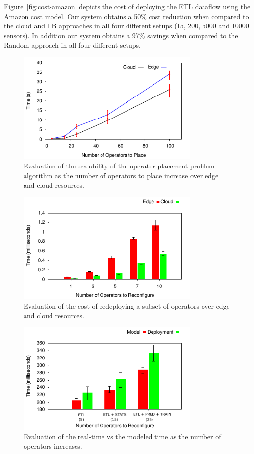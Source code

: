
Figure~\ref{fig:cost-amazon} depicts the cost of deploying the ETL dataflow using the Amazon cost model. Our system obtains a 50\% cost reduction when compared to the cloud and LB approaches in all four different setups (15, 200, 5000 and 10000 sensors). In addition our system obtains a 97\% savings when compared to the Random approach in all four different setups.


\begin{figure}[h]
  \centering
  \includegraphics[width=0.8\textwidth]{Results/Scale.pdf}
  \caption{Evaluation of the scalability of the operator placement problem algorithm as the number of operators to place increase over edge and cloud resources.}
\end{figure}

\begin{figure}[h]
  \centering
  \includegraphics[width=0.8\textwidth]{Results/Redeploy.pdf}
  \caption{Evaluation of the cost of redeploying a subset of operators over edge and cloud resources.}
\end{figure}

\begin{figure}[h]
  \centering
  \includegraphics[width=0.8\textwidth]{Results/Time.pdf}
  \caption{Evaluation of the real-time vs the modeled time as the number of operators increases.}
\end{figure}
